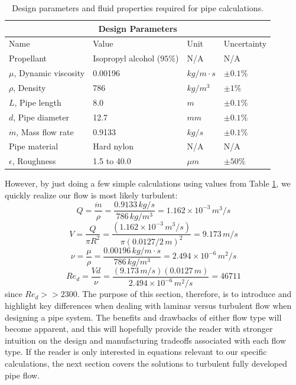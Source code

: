 \documentclass[10pt]{article} %
\numberwithin{equation}{section} %
\begin{document}
\begin{multicols}{2}
\begin{table}[!htb]
\centering
\begin{tabular}{ |p{4cm}||p{4cm}|p{2cm}|p{2cm}|  }
\hline
\multicolumn{4}{|c|}{Design Parameters} \\
\hline
Name & Value & Unit & Uncertainty \\
\hline
Propellant  &  Isopropyl alcohol ($95\%$)   &  N/A  &  N/A \\
$\mu$, Dynamic viscosity  &  0.00196  &  $kg/m \cdot s$  &  $\pm 0.1 \%$ \\
$\rho$, Density  &  786  &  $kg/m^{3}$  &  $\pm 1 \%$ \\
$L$, Pipe length  &  8.0  &  $m$  &  $\pm 0.1 \%$  \\
$d$, Pipe diameter  &  12.7  &  $mm$  &   $\pm 0.1 \%$ \\
$\dot{m}$, Mass flow rate  &  0.9133  &  $kg/s$  &   $\pm 0.1 \%$ \\
Pipe material  &  Hard nylon  &  N/A  &  N/A \\
$\epsilon$, Roughness  &  1.5 to 40.0  &  $\mu m$  &  $\pm 50 \%$ \\
\hline
\end{tabular}
\caption{Design parameters and fluid properties required for pipe calculations.}
\label{table:parameters}
\end{table}
However, by just doing a few simple calculations using values from Table \ref{table:parameters}, we quickly realize our flow is most likely turbulent:
\begin{equation}
Q = \frac{\dot{m}}{\rho} = \frac{0.9133\, kg/s}{786\, kg/m^{3}} = 1.162 \times 10^{-3}\, m^{3}/s
\end{equation}
\begin{equation}
V = \frac{Q}{\pi R^{2}} = \frac{(1.162 \times 10^{-3}\, m^{3}/s)}{\pi (0.0127 / 2\, m)^{2}} = 9.173\, m/s
\end{equation}
\begin{equation}
\nu = \frac{\mu}{\rho} = \frac{0.00196\, kg/m \cdot s}{786\, kg/m^{3}} = 2.494 \times 10^{-6}\, m^{2}/s
\end{equation}
\begin{equation}
Re_{d} = \frac{V d}{\nu} = \frac{(9.173\, m/s)(0.0127\, m)}{2.494 \times 10^{-6}\, m^{2}/s} = 46711
\end{equation}
since $Re_{d} >> 2300$. The purpose of this section, therefore, is to introduce and highlight key differences when dealing with laminar versus turbulent flow when designing a pipe system. The benefits and drawbacks of either flow type will become apparent, and this will hopefully provide the reader with stronger intuition on the design and manufacturing tradeoffs associated with each flow type. If the reader is only interested in equations relevant to our specific calculations, the next section covers the solutions to turbulent fully developed pipe flow.


\end{multicols}
\end{document}
